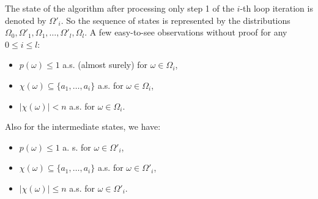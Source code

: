 \documentclass{article}
\theoremstyle{definition}
\begin{document}
The state of the algorithm after processing only step 1 of the $i$-th loop iteration is denoted by $\Omega'_i$.
So the sequence of states is represented by the distributions $\Omega_0, \Omega'_1, \Omega_1, \ldots, \Omega'_l, \Omega_l$.
A few easy-to-see observations without proof for any $0 \leq i \leq l$:
\begin{itemize}
\item $p(\omega) \leq 1$ a.s. (almost surely) for $\omega \in \Omega_i$,
\item $\chi(\omega) \subseteq \{a_1,\ldots,a_i\}$ a.s. for $\omega \in \Omega_i$,
\item $|\chi(\omega)| < n$ a.s. for $\omega \in \Omega_i$.
\end{itemize}
Also for the intermediate states, we have:
\begin{itemize}
\item $p(\omega) \leq 1$ a. s. for $\omega \in \Omega'_i$,
\item $\chi(\omega) \subseteq \{a_1,\ldots,a_i\}$ a.s. for $\omega \in \Omega'_i$,
\item $|\chi(\omega)| \leq n$ a.s. for $\omega \in \Omega'_i$.
\end{itemize}
\end{document}
